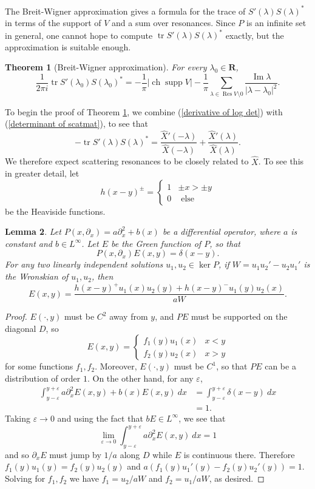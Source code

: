 \documentclass[12pt]{report}
\newcommand{\RR}{\mathbf{R}}
\DeclareMathOperator{\ch}{ch}
\DeclareMathOperator{\Res}{Res}
\DeclareMathOperator{\supp}{supp}
\newcommand{\tr}{\operatorname{tr}}
\renewcommand{\Im}{\operatorname{Im}}
\newtheorem{theorem}{Theorem}[chapter]
\newtheorem{lemma}[theorem]{Lemma}
\theoremstyle{definition}
\begin{document}
The Breit-Wigner approximation gives a formula for the trace of $S'(\lambda)S(\lambda)^*$ in terms of the support of $V$ and a sum over resonances. Since $P$ is an infinite set in general, one cannot hope to compute $\tr S'(\lambda)S(\lambda)^*$ exactly, but the approximation is suitable enough.
\begin{theorem}[Breit-Wigner approximation]
\label{proof of Breit-Wigner}
For every $\lambda_0 \in \RR$,
$$\frac{1}{2\pi i} \tr S'(\lambda_0)S(\lambda_0)^* = -\frac{1}{\pi}|\ch\supp V| - \frac{1}{\pi}\sum_{\lambda \in \Res V \setminus 0} \frac{\Im \lambda}{|\lambda - \lambda_0|^2}.$$
\end{theorem}
To begin the proof of Theorem \ref{proof of Breit-Wigner}, we combine (\ref{derivative of log det}) with (\ref{determinant of scatmat}), to see that
\begin{equation}
\label{trace of log derivative}
-\tr S'(\lambda)S(\lambda)^* = \frac{\hat X'(-\lambda)}{\hat X(-\lambda)} + \frac{\hat X'(\lambda)}{\hat X(\lambda)}.
\end{equation}
We therefore expect scattering resonances to be closely related to $\hat X$. To see this in greater detail, let
$$h(x - y)^\pm= \begin{cases}
1 &\pm x > \pm y\\
0 &\text{ else}
\end{cases}$$
be the Heaviside functions.
\begin{lemma}
\label{decomposition of Green function}
Let $P(x, \partial_x) = a\partial_x^2 + b(x)$ be a differential operator, where $a$ is constant and $b \in L^\infty$. Let $E$ be the Green function of $P$, so that
$$P(x, \partial_x)E(x, y) = \delta(x - y).$$
For any two linearly independent solutions $u_1, u_2 \in \ker P$, if $W = u_1u_2' - u_2u_1'$ is the Wronskian of $u_1, u_2$, then
$$E(x, y) = \frac{h(x - y)^+ u_1(x) u_2(y) + h(x - y)^- u_1(y) u_2(x)}{aW}.$$
\end{lemma}
\begin{proof}
$E(\cdot, y)$ must be $C^2$ away from $y$, and $PE$ must be supported on the diagonal $D$, so
$$E(x, y) = \begin{cases}
f_1(y)u_1(x)&x < y\\
f_2(y)u_2(x)&x > y
\end{cases}$$
for some functions $f_1,f_2$. Moreover, $E(\cdot, y)$ must be $C^1$, so that $PE$ can be a distribution of order $1$. On the other hand, for any $\varepsilon$,
\begin{align*}\int_{y-\varepsilon}^{y + \varepsilon} a\partial_x^2E(x, y) + b(x)E(x, y) ~dx &= \int_{y-\varepsilon}^{y+\varepsilon} \delta(x - y) ~dx \\&= 1.\end{align*}
Taking $\varepsilon \to 0$ and using the fact that $bE \in L^\infty$, we see that
$$\lim_{\varepsilon \to 0} \int_{y-\varepsilon}^{y + \varepsilon} a\partial_x^2E(x, y) ~dx = 1$$
and so $\partial_xE$ must jump by $1/a$ along $D$ while $E$ is continuous there. Therefore $f_1(y)u_1(y) = f_2(y)u_2(y)$ and $a(f_1(y)u_1'(y) - f_2(y)u_2'(y)) = 1$.
Solving for $f_1,f_2$ we have $f_1 = u_2/aW$ and $f_2 = u_1/aW$, as desired.
\end{proof}
\end{document}

